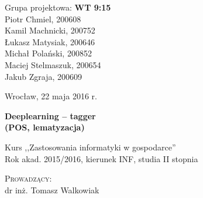 \noindent
\begin{minipage}[t]{.5\linewidth}
	\begin{flushleft}
		Grupa projektowa: \textbf{WT 9:15}\\
		\vspace{0.8cm}
		Piotr Chmiel, 200608\\
		Kamil Machnicki, 200752\\
		Łukasz Matysiak, 200646\\
		Michał Polański, 200852\\
		Maciej Stelmaszuk, 200654\\
		Jakub Zgraja, 200609\\
	\end{flushleft} 
\end{minipage}%
\begin{minipage}[t]{.5\linewidth}
	\begin{flushright}
		Wrocław, 22 maja 2016 r.\\
		\vspace{.35cm}

	\end{flushright}
\end{minipage}

\vspace{3.0cm}

\begin{center}
	{\Huge\bf Deeplearning -- tagger}\\
	{\Large\bf (POS, lematyzacja)}\\
		
\end{center}

\begin{center}
	{\large Kurs ,,Zastosowania informatyki w gospodarce''}\\
	{\large Rok akad. 2015/2016, kierunek INF, studia II stopnia}
\end{center}

\vspace{2cm}
\begin{center}
		\textsc{Prowadzący:}\\
		dr inż. Tomasz Walkowiak
\end{center}
